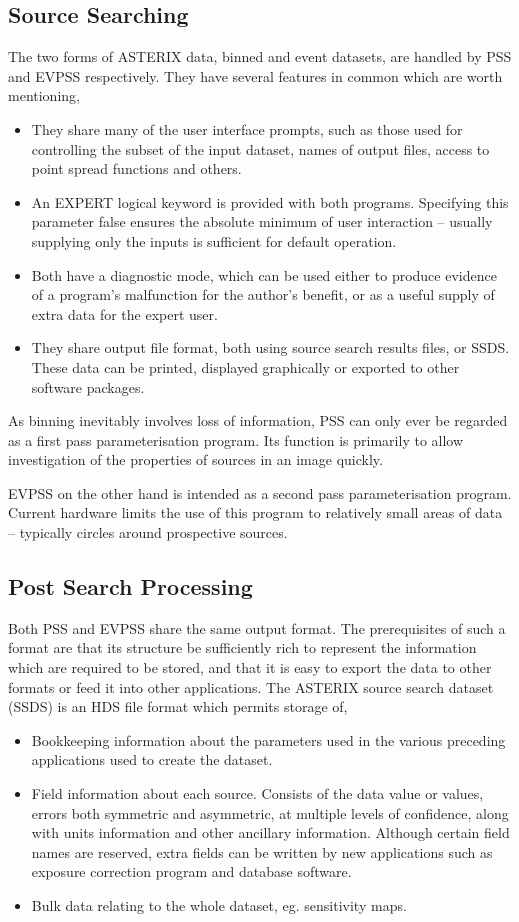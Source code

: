 \subsection{Source Searching}

The two forms of ASTERIX data, binned and event datasets, are handled
by PSS and EVPSS respectively. They have several features in common
which are worth mentioning,
\begin{itemize}
\item They share many of the user interface prompts, such as those
used for controlling the subset of the input dataset,
names of output files, access to point spread functions and others.
\item An EXPERT logical keyword is provided with both programs. Specifying
this parameter false ensures the absolute minimum of user interaction --
usually supplying only the inputs is sufficient for default operation.
\item Both have a diagnostic mode, which can be used either to produce
evidence of a program's malfunction for the author's
benefit, or as a useful supply of extra data for the expert user.
\item They share output file format, both using source search results
files, or SSDS. These data can be printed, displayed graphically or
exported to other software packages.
\end{itemize}
As binning inevitably involves loss of information, PSS can only ever
be regarded as a first pass parameterisation program. Its function is
primarily to allow investigation of the properties of sources in an
image quickly. 

EVPSS on the other hand is intended as a second pass parameterisation
program. Current hardware limits the use of this program to relatively
small areas of data -- typically circles around prospective sources.

\subsection{Post Search Processing}

Both PSS and EVPSS share the same output format. The prerequisites of
such a format are that its structure be sufficiently rich to represent
the information which are required to be stored, and that it is easy to
export the data to other formats or feed it into other applications.
The ASTERIX source search dataset (SSDS) is an HDS file format which
permits storage of,
\begin{itemize}
\item Bookkeeping information about the parameters used in the various
preceding applications used to create the dataset.
\item Field information about each source. Consists of the data value
or values, errors both symmetric and asymmetric, at multiple levels of
confidence, along with units information and other ancillary information.
Although certain field
names are reserved, extra fields can be written by new applications
such as exposure correction program and database software.
\item Bulk data relating to the whole dataset, eg. sensitivity maps.
\end{itemize}

